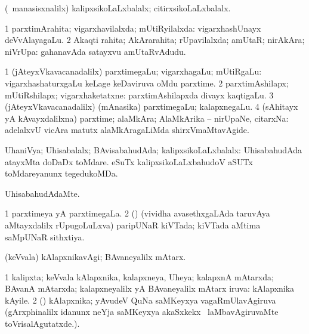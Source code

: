 \bentry
{}
\gl{\gu}
\bmng
(\kanmu\ manasisxnalilx) kalipxsikoLaLxbalalx; citirxsikoLaLxbalalx. 
\emng
\eentry

\bentry
{}
\gl{\gu}
\bmng
\bnum
\num{1} parxtimArahita; vigarxhavilalxda; mUtiRyilalxda:  vigarxhashUnayx deVvAlayagaLu. 
\num{2} Akaqti rahita; AkArarahita; rUpavilalxda; amUtaR; nirAkAra; niVrUpa:  gahanavAda satayxvu amUtaRvAdudu. 
\enum
\emng
\eentry

\bentry
{}
\gl{\nA}
\bmng
\bnum
\num{1} (jAteyxVkavacanadalilx) parxtimegaLu; vigarxhagaLu; mUtiRgaLu:  vigarxhashaturxgaLu keLage keDaviruva oMdu parxtime. 
\num{2} parxtimAshilapx; mUtiRshilapx; vigarxhaketatxne:  parxtimAshilapxda divayx kaqtigaLu. 
\num{3} (jAteyxVkavacanadalilx) (mAnasika) parxtimegaLu; kalapxnegaLu. 
\num{4} (sAhitayx yA kAvayxdalilxna) parxtime; alaMkAra; AlaMkArika -- nirUpaNe, citarxNa:  adelalxvU vicAra matutx alaMkAragaLiMda shirxVmaMtavAgide. 
\enum
\emng
\eentry

\bentry
{}
\gl{\gu}
\bmng
UhaniVya; Uhisabalalx; BAvisabahudAda; kalipxsikoLaLxbalalx:  UhisabahudAda atayxMta doDaDx toMdare.  eSuTx kalipxsikoLaLxbahudoV aSUTx toMdareyanunx tegedukoMDa. 
\emng
\eentry

\bentry
{}
\gl{\kirxvi}
\bmng
UhisabahudAdaMte. 
\emng
\eentry

\bentry
{}
\gl{\gu}
\bmng
\bnum
\num{1} parxtimeya yA parxtimegaLa. 
\num{2} (\kiVvi) (vividha avasethxgaLAda taruvAya aMtayxdalilx rUpugoLuLxva) paripUNaR kiVTada; kiVTada aMtima saMpUNaR sithxtiya. 
\enum
\emng
\eentry

\bentry
{}
\gl{\kirxvi}
\bmng
(keVvala) kAlapxnikavAgi; BAvaneyalilx mAtarx. 
\emng
\eentry

\bentry
{}
\gl{\gu}
\bmng
\bnum
\num{1} kalipxta; keVvala kAlapxnika, kalapxneya, Uheya; kalapxnA mAtarxda; BAvanA mAtarxda; kalapxneyalilx yA BAvaneyalilx mAtarx iruva:  kAlapxnika kAyile. 
\num{2} (\ga) kAlapxnika; yAvudeV QuNa saMKeyxya vagaRmUlavAgiruva (gArxphinalilx idanunx neYja saMKeyxya akaSxkekx \sA\ laMbavAgiruvaMte toVrisalAgutatxde.). 
\enum
\emng
\eentry

